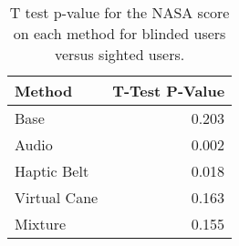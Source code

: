 
\begin{table}[!htb]
\centering
\caption{T test p-value for the NASA score on each method for blinded users versus sighted users.}
\label{tab:ttest_nasa_score}
\begin{tabular}{lr}
\toprule
      Method &  T-Test P-Value \\
\midrule
        Base &           0.203 \\
       Audio &           0.002 \\
 Haptic Belt &           0.018 \\
Virtual Cane &           0.163 \\
     Mixture &           0.155 \\
\bottomrule
\end{tabular}
\end{table}

